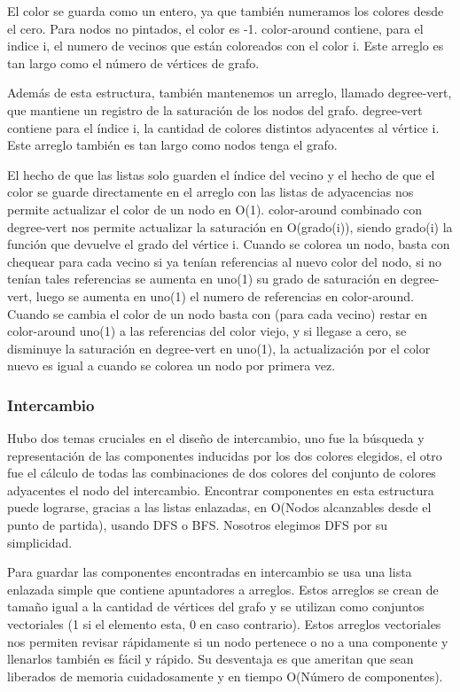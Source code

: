 \documentclass[a4paper,10pt]{article}
\begin{document}
El color se guarda como un entero, ya que también numeramos los colores
desde el cero. Para nodos no pintados, el color es -1.
color-around contiene, para el indice i, el numero de vecinos que están
coloreados con el color i. Este arreglo es tan largo como el número de
vértices de grafo.

Además de esta estructura, también mantenemos un arreglo, llamado
degree-vert, que mantiene un registro de la saturación de los nodos del
grafo. degree-vert contiene para el índice i, la cantidad de colores
distintos adyacentes al vértice i. Este arreglo también es tan largo
como nodos tenga el grafo.

El hecho de que las listas solo guarden el índice del vecino y el hecho
de que el color se guarde directamente en el arreglo con las listas de
adyacencias nos permite actualizar el color de un nodo en O(1).
color-around combinado con degree-vert nos permite actualizar la
saturación en O(grado(i)), siendo grado(i) la función que devuelve el
grado del vértice i. Cuando se colorea un nodo, basta con chequear para
cada vecino si ya tenían referencias al nuevo color del nodo, si no
tenían tales referencias se aumenta en uno(1) su grado de saturación en
degree-vert, luego se aumenta en uno(1) el numero de referencias en
color-around. Cuando se cambia el color de un nodo basta con (para cada
vecino) restar en color-around uno(1) a las referencias del color viejo,
y si llegase a cero, se disminuye la saturación en degree-vert en
uno(1), la actualización por el color nuevo es igual a cuando se colorea
un nodo por primera vez.


\subsubsection{Intercambio}

Hubo dos temas cruciales en el diseño de intercambio, uno fue la
búsqueda y representación de las componentes inducidas por los dos
colores elegidos, el otro fue el cálculo de todas las combinaciones de
dos colores del conjunto de colores adyacentes el nodo del intercambio.
Encontrar componentes en esta estructura puede lograrse, gracias a las
listas enlazadas, en O(Nodos alcanzables desde el punto de partida),
usando DFS o BFS. Nosotros elegimos DFS por su simplicidad.

Para guardar las componentes encontradas en intercambio se usa una lista
enlazada simple que contiene apuntadores a arreglos. Estos arreglos se
crean de tamaño igual a la cantidad de vértices del grafo y se utilizan
como conjuntos vectoriales (1 si el elemento esta, 0 en caso
contrario). Estos arreglos vectoriales nos permiten revisar rápidamente
si un nodo pertenece o no a una componente y llenarlos también es fácil
y rápido. Su desventaja es que ameritan que sean liberados de memoria
cuidadosamente y en tiempo O(Número de componentes).
\end{document}
